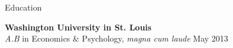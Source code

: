 \begin{rSection}{\textrm{Education}}

{\bf Washington University in St. Louis}\\
{\em A.B} in Economics \& Psychology, \textit{magna cum laude} \hfill{May 2013}%
\vspace{-1ex}\end{rSection}
